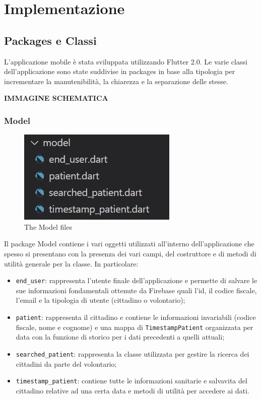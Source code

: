 \documentclass[12pt,a4paper,twoside,openright,titlepage]{book}
\begin{document}
\chapter{Implementazione}
\section{Packages e Classi}
L'applicazione mobile è stata sviluppata utilizzando Flutter 2.0. Le varie classi dell'applicazione sono state suddivise in packages in base alla tipologia per incrementare la manutenibilità, la chiarezza e la separazione delle stesse.\newline

\textbf{IMMAGINE SCHEMATICA}

\subsection{Model}
\begin{figure}[H]
\centering
\includegraphics[scale = 1.0]{model}
\caption{The Model files}
\end{figure}
Il package Model contiene i vari oggetti utilizzati all'interno dell'applicazione che spesso si presentano con la presenza dei vari campi, del costruttore e di metodi di utilità generale per la classe. In particolare:
\begin{itemize}
\item \texttt{end\_user}: rappresenta l'utente finale dell'applicazione e permette di salvare le sue informazioni fondamentali ottenute da Firebase quali l'id, il codice fiscale, l'email e la tipologia di utente (cittadino o volontario);
\item \texttt{patient}: rappresenta il cittadino e contiene le informazioni invariabili (codice fiscale, nome e cognome) e una mappa di \texttt{TimestampPatient} organizzata per data con la funzione di storico per i dati precedenti a quelli attuali;
\item \texttt{searched\_patient}: rappresenta la classe utilizzata per gestire la ricerca dei cittadini da parte del volontario;
\item \texttt{timestamp\_patient}: contiene tutte le informazioni sanitarie e salvavita del cittadino relative ad una certa data e metodi di utilità per accedere ai dati.
\end{itemize}
\end{document}
